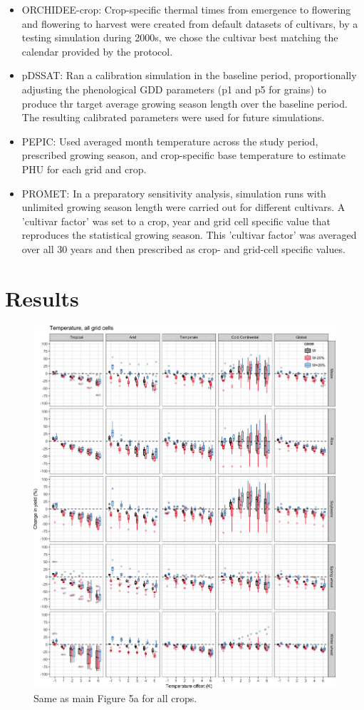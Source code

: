 \documentclass[10pt]{article}
\begin{document}
\begin{itemize}
    \item ORCHIDEE-crop: Crop-specific thermal times from emergence to flowering and flowering to harvest were created from default datasets of cultivars, by a testing simulation during 2000s, we chose the cultivar best matching the  calendar provided by the protocol.
    \item pDSSAT: Ran a calibration simulation in the baseline period, proportionally adjusting the phenological GDD parameters (p1 and p5 for grains) to produce thr target average growing season length over the baseline period. The resulting calibrated parameters were used for future simulations. 
    \item PEPIC: Used averaged month temperature across the study period, prescribed growing season, and crop-specific base temperature to estimate PHU for each grid and crop.
    \item PROMET: In a preparatory sensitivity analysis, simulation runs with unlimited growing season length were carried out for different cultivars. A 'cultivar factor' was set to a crop, year and grid cell specific value that reproduces the statistical growing season. This 'cultivar factor'  was averaged over all 30 years and then prescribed as crop- and grid-cell specific values.
\end{itemize}

\clearpage
\section{Results}

\begin{figure}[h!]
    \centering
    \includegraphics[width=\textwidth]{s_sim_CG_T.png}
    \caption{Same as main Figure 5a for all crops.}
    \label{fig:temperautre}
\end{figure}
\end{document}

